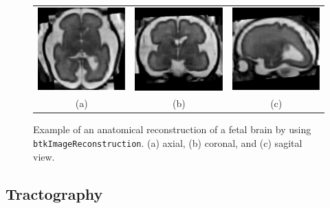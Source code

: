\begin{figure}[t]
\centering
\begin{tabular}{ccc}
\includegraphics[width=0.3\columnwidth]{hr_axl.eps}&
\includegraphics[width=0.3\columnwidth]{hr_cor.eps}&
\includegraphics[width=0.3\columnwidth]{hr_sag.eps}\\
{(a)}&{(b)}&{(c)}\\
\end{tabular}
\caption{Example of an anatomical reconstruction of a fetal brain by using
\texttt{btkImageReconstruction}. (a) axial, (b) coronal, and (c) sagital view.}
\label{fig:reconstruction}
\end{figure}

\subsection{Tractography}
